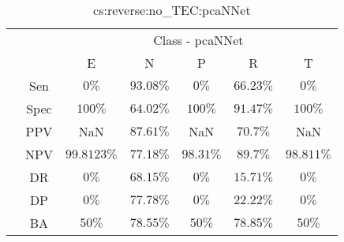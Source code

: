\begin{table}[!ht]
	\centering
	\begin{tabular}{|c|c|c|c|c|c|c|}
		\cline{3-7}
		\multicolumn{2}{c|}{} & \multicolumn{5}{c|}{Class - pcaNNet} \\ \cline{3-7}
		\multicolumn{2}{c|}{} & E & N & P & R & T \\ \hline
		\multirow{7}{*}{\rotatebox{90}{Statistics}} & Sen & $0\%$ & $93.08\%$ & $0\%$ & $66.23\%$ & $0\%$ \\ \cline{2-7}
		 & Spec & $100\%$ & $64.02\%$ & $100\%$ & $91.47\%$ & $100\%$ \\ \cline{2-7}
		 & PPV & NaN & $87.61\%$ & NaN & $70.7\%$ & NaN \\ \cline{2-7}
		 & NPV & $99.8123\%$ & $77.18\%$ & $98.31\%$ & $89.7\%$ & $98.811\%$ \\ \cline{2-7}
		 & DR & $0\%$ & $68.15\%$ & $0\%$ & $15.71\%$ & $0\%$ \\ \cline{2-7}
		 & DP & $0\%$ & $77.78\%$ & $0\%$ & $22.22\%$ & $0\%$ \\ \cline{2-7}
		 & BA & $50\%$ & $78.55\%$ & $50\%$ & $78.85\%$ & $50\%$ \\ \hline
	\end{tabular}
	\caption{cs:reverse:no_TEC:pcaNNet}
	\label{tab:cs:reverse:no_TEC:pcaNNet}
\end{table}
